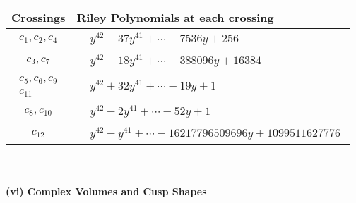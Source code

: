 \documentclass[1p]{elsarticle_modified}
\theoremstyle{definition}
\begin{document}
\begin{tabular}{m{50pt}|m{274pt}}
Crossings & \hspace{64pt}Riley Polynomials at each crossing \\
\hline $$\begin{aligned}c_{1},c_{2},c_{4}\end{aligned}$$&$\begin{aligned}
&y^{42}-37 y^{41}+\cdots-7536 y+256
\end{aligned}$\\
\hline $$\begin{aligned}c_{3},c_{7}\end{aligned}$$&$\begin{aligned}
&y^{42}-18 y^{41}+\cdots-388096 y+16384
\end{aligned}$\\
\hline $$\begin{aligned}c_{5},c_{6},c_{9}\\c_{11}\end{aligned}$$&$\begin{aligned}
&y^{42}+32 y^{41}+\cdots-19 y+1
\end{aligned}$\\
\hline $$\begin{aligned}c_{8},c_{10}\end{aligned}$$&$\begin{aligned}
&y^{42}-2 y^{41}+\cdots-52 y+1
\end{aligned}$\\
\hline $$\begin{aligned}c_{12}\end{aligned}$$&$\begin{aligned}
&y^{42}- y^{41}+\cdots-16217796509696 y+1099511627776
\end{aligned}$\\
\hline
\end{tabular}\\~\\
\newpage\flushleft \textbf{(vi) Complex Volumes and Cusp Shapes}
\end{document}
